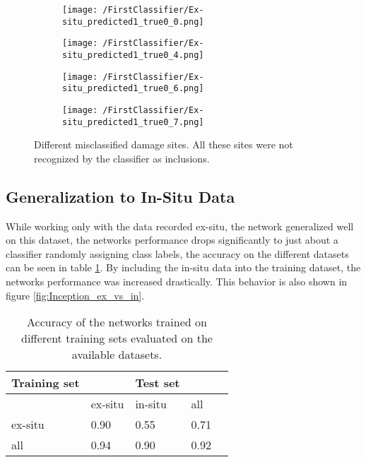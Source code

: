 \begin{figure}
\centering
\begin{subfigure}{.24\textwidth}
\texttt{[image: /FirstClassifier/Ex-situ\_predicted1\_true0\_0.png]}
\caption{}
\label{sub:IncAsRest1}
\end{subfigure}
\centering
\begin{subfigure}{.24\textwidth}
\texttt{[image: /FirstClassifier/Ex-situ\_predicted1\_true0\_4.png]}
\caption{}
\label{sub:IncAsRest2}
\end{subfigure}
\centering
\begin{subfigure}{.24\textwidth}
\texttt{[image: /FirstClassifier/Ex-situ\_predicted1\_true0\_6.png]}
\caption{}
\label{sub:IncAsRest3}
\end{subfigure}
\centering
\begin{subfigure}{.24\textwidth}
\texttt{[image: /FirstClassifier/Ex-situ\_predicted1\_true0\_7.png]}
\caption{}
\label{sub:IncAsRest4}
\end{subfigure}
\caption{Different misclassified damage sites. All these sites were not recognized by the classifier as inclusions.}
\label{fig:InceptionExSituPredictedRestTrueInc}
\end{figure}

\subsection{Generalization to In-Situ Data}

While working only with the data recorded ex-situ, the network generalized well on this dataset, the networks performance drops significantly to just about a classifier randomly assigning class labels, the accuracy on the different datasets can be seen in table \ref{tab:AccuracyComparisonInception}. By including the in-situ data into the training dataset, the networks performance was increased drastically. This behavior is also shown in figure \ref{fig:Inception_ex_vs_in}. \\

\begin{table}[H]
 \begin{center}
  \begin{tabular}{@{} *5l @{}} \toprule[2pt]
   Training set &  &Test set&  \\\midrule
    & ex-situ  & in-situ  & all   \\ 
   ex-situ  & 0.90 & 0.55 & 0.71\\ 
   all  & 0.94 & 0.90 & 0.92\\\bottomrule[2pt]

  \end{tabular}
 \end{center}
 \caption{Accuracy of the networks trained on different training sets evaluated on the available datasets.}
 \label{tab:AccuracyComparisonInception}
\end{table}


